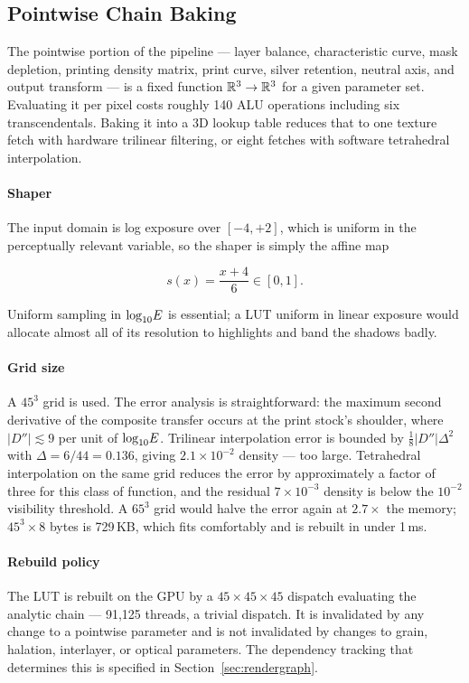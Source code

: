 \subsection{Pointwise Chain Baking}
\label{sec:lutbake}

The pointwise portion of the pipeline --- layer balance, characteristic curve,
mask depletion, printing density matrix, print curve, silver retention, neutral
axis, and output transform --- is a fixed function $\mathbb{R}^3 \to \mathbb{R}^3$ for
a given parameter set. Evaluating it per pixel costs roughly 140 ALU operations
including six transcendentals. Baking it into a 3D lookup table reduces that to
one texture fetch with hardware trilinear filtering, or eight fetches with
software tetrahedral interpolation.

\paragraph{Shaper} The input domain is log exposure over $[-4, +2]$, which is
uniform in the perceptually relevant variable, so the shaper is simply the
affine map

\begin{equation}
s(x) = \frac{x + 4}{6} \in [0,1].
\end{equation}

Uniform sampling in $\log_{10}\!E$ is essential; a LUT uniform in linear exposure would
allocate almost all of its resolution to highlights and band the shadows badly.

\paragraph{Grid size} A $45^3$ grid is used. The error analysis is
straightforward: the maximum second derivative of the composite transfer occurs
at the print stock's shoulder, where $|D''| \lesssim 9$ per unit of $\log_{10}\!E$.
Trilinear interpolation error is bounded by $\tfrac{1}{8}|D''|\Delta^2$ with
$\Delta = 6/44 = 0.136$, giving $2.1 \times 10^{-2}$ density --- too large.
Tetrahedral interpolation on the same grid reduces the error by approximately a
factor of three for this class of function, and the residual $7\times10^{-3}$
density is below the $10^{-2}$ visibility threshold. A $65^3$ grid would halve
the error again at $2.7\times$ the memory; $45^3 \times 8$ bytes is 729\,KB,
which fits comfortably and is rebuilt in under 1\,ms.

\paragraph{Rebuild policy} The LUT is rebuilt on the GPU by a
$45\times45\times45$ dispatch evaluating the analytic chain --- 91{,}125 threads,
a trivial dispatch. It is invalidated by any change to a pointwise parameter and
is not invalidated by changes to grain, halation, interlayer, or optical
parameters. The dependency tracking that determines this is specified in
Section~\ref{sec:rendergraph}.

